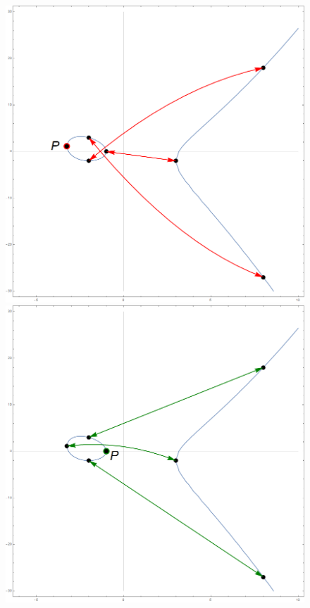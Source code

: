 \documentclass[../../tesis_maestria]{subfiles}
\begin{document}
\begin{figure}\centering
\begin{minipage}[t]{0.3\textwidth}
	\includegraphics[width=\textwidth]{figuras/orbitas-puntos-2}
\end{minipage}
\begin{minipage}[t]{0.3\textwidth}
	\includegraphics[width=\textwidth]{figuras/orbitas-puntos-1}

\end{minipage}
\end{figure}
\end{document}
